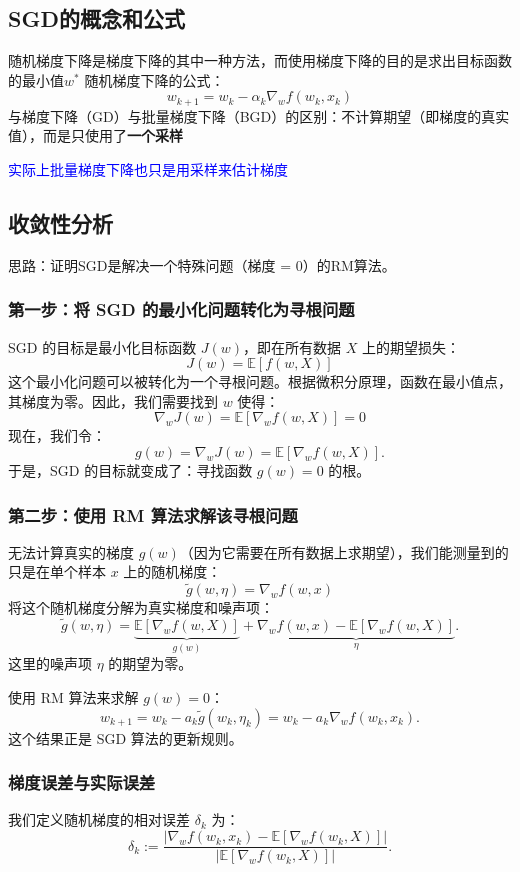 \documentclass{article}
\begin{document}
\subsection{SGD的概念和公式}
随机梯度下降是梯度下降的其中一种方法，而使用梯度下降的目的是求出目标函数的最小值$w^*$
随机梯度下降的公式：
$$
w_{k+1} = w_k - \alpha_k \nabla_w f(w_k, x_k)
$$
与梯度下降（GD）与批量梯度下降（BGD）的区别：不计算期望（即梯度的真实值），而是只使用了\textbf{一个采样}

\textcolor{blue}{\kaishu*实际上批量梯度下降也只是用采样来估计梯度}
\subsection{收敛性分析}
思路：证明SGD是解决一个特殊问题（梯度 = 0）的RM算法。
\subsubsection*{第一步：将 SGD 的最小化问题转化为寻根问题}

SGD 的目标是最小化目标函数 $J(w)$，即在所有数据 $X$ 上的期望损失：
\[
J(w) = \mathbb{E}[f(w, X)]
\]
这个最小化问题可以被转化为一个寻根问题。根据微积分原理，函数在最小值点，其梯度为零。因此，我们需要找到 $w$ 使得：
\[
\nabla_w J(w) = \mathbb{E}[\nabla_w f(w, X)] = 0
\]
现在，我们令：
\[
g(w) = \nabla_w J(w) = \mathbb{E}[\nabla_w f(w, X)].
\]
于是，SGD 的目标就变成了：寻找函数 $g(w)=0$ 的根。

\subsubsection*{第二步：使用 RM 算法求解该寻根问题}

无法计算真实的梯度 $g(w)$（因为它需要在所有数据上求期望），我们能测量到的只是在单个样本 $x$ 上的随机梯度：
\[
\tilde{g}(w, \eta) = \nabla_w f(w, x)
\]
将这个随机梯度分解为真实梯度和噪声项：
\[
\tilde{g}(w, \eta) = \underbrace{\mathbb{E}[\nabla_w f(w, X)]}_{g(w)} + \underbrace{\nabla_w f(w, x) - \mathbb{E}[\nabla_w f(w, X)]}_{\eta}.
\]
这里的噪声项 $\eta$ 的期望为零。

使用 RM 算法来求解 $g(w)=0$：
\[
w_{k+1} = w_k - a_k \tilde{g}(w_k, \eta_k) = w_k - a_k \nabla_w f(w_k, x_k).
\]
这个结果正是 SGD 算法的更新规则。
\subsubsection{梯度误差与实际误差}
我们定义随机梯度的相对误差 $\delta_k$ 为：
\[
\delta_k := \frac{|\nabla_w f(w_k, x_k) - \mathbb{E}[\nabla_w f(w_k, X)]|}{|\mathbb{E}[\nabla_w f(w_k, X)]|}.
\]
\end{document}
